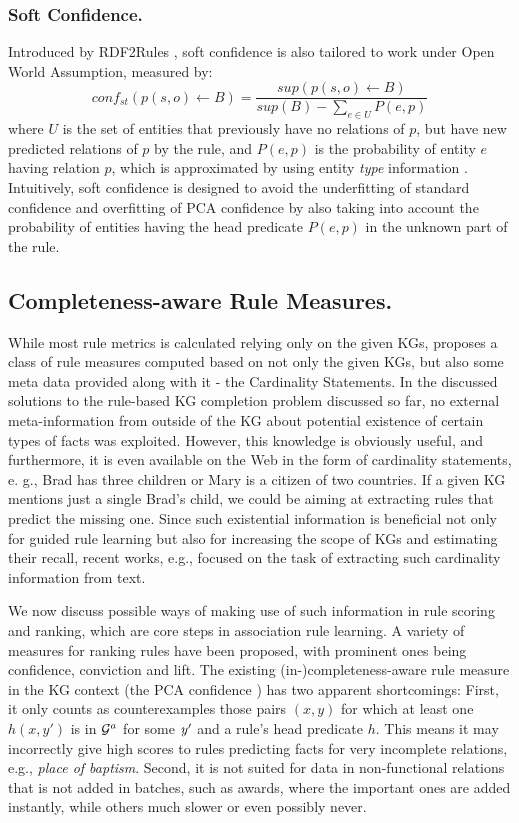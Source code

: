 \subsubsection{Soft Confidence.} Introduced by RDF2Rules \cite{rdf2rules}, soft confidence is also tailored to work under Open World Assumption, measured by:
\[conf_{st}(p(s,o) \leftarrow B) = \frac{sup(p(s,o) \leftarrow B)}{sup(B) - \sum_{e \in U}P(e,p)} \]
where $U$ is the set of entities that previously have no relations of $p$, but have new predicted relations of $p$ by the rule, and $P(e,p)$ is the probability of entity $e$ having relation $p$, which is approximated by using entity \textit{type} information \cite{rdf2rules}. Intuitively, soft confidence is designed to avoid the underfitting of standard confidence and overfitting of PCA confidence by also taking into account the probability of entities having the head predicate $P(e,p)$ in the unknown part of the rule.
\subsection{Completeness-aware Rule Measures.} While most rule metrics is calculated relying only on the given KGs, \cite{DBLP:conf/semweb/TanonSRMW17} proposes a class of rule measures computed based on not only the given KGs, but also some meta data provided along with it - the Cardinality Statements.
In the discussed solutions to the rule-based KG completion problem discussed so far, no external meta-information
from outside of the KG about potential existence of certain types of facts was exploited.
However, this knowledge is obviously useful, and furthermore, it is even available on the Web
in the form of cardinality statements, e. g., Brad has three children or Mary is a citizen of two countries. 
If a given KG mentions just a single Brad’s child, we could be aiming at extracting rules that predict the missing
one. Since such existential information is beneficial not only for guided rule learning but
also for increasing the scope of KGs and estimating their recall, recent works, e.g., \cite{cardinality-extraction-iswc-2016} focused 
on the task of extracting such cardinality information from text.

We now discuss possible ways of making use of such information in rule scoring and ranking, which are core steps in association rule learning. A variety of measures for ranking rules have been proposed, with prominent ones being confidence, conviction and lift.  
The existing (in-)completeness-aware rule measure in the KG context (the PCA confidence \cite{amie}) 
has two apparent shortcomings: First,  
it only counts as counterexamples those %
pairs $(x,y)$ for which at least one 
$h(x,y')$ %
is in $\mathcal{G}^a$ for some $\mathit{y'}$ and a rule's head predicate $h$. This means it may incorrectly give high scores to rules predicting facts for very incomplete relations, e.g., \emph{place of baptism}. 
Second, it is not suited for data in non-functional relations that is not added in batches, such as awards, where 
the important ones are added instantly, 
while others much slower or even possibly never. 



